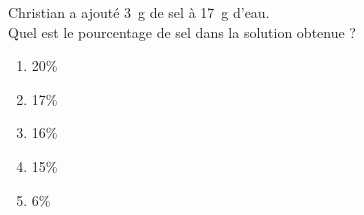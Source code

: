 Christian a ajouté 3~g de sel à 17~g d'eau.\\Quel est le pourcentage de sel dans la solution obtenue ?
\begin{multicols}{5}
  \begin{enumerate}[A/]
  \item 20\%
  \item 17\%
  \item 16\%
  \item 15\%
  \item 6\%
  \end{enumerate}
\end{multicols}